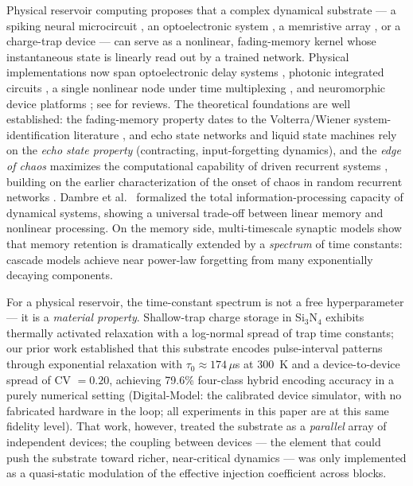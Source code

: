 \documentclass[11pt]{article}
\begin{document}
Physical reservoir computing proposes that a complex dynamical substrate --- a
spiking neural microcircuit \cite{maass2002}, an optoelectronic system
\cite{larger2012}, a memristive array \cite{du2017}, or a charge-trap device
\cite{prior} --- can serve as a nonlinear, fading-memory kernel whose
instantaneous state is linearly read out by a trained network. Physical
implementations now span optoelectronic delay systems
\cite{larger2012,paquot2012}, photonic integrated circuits \cite{brunner2013},
a single nonlinear node under time multiplexing \cite{appeltant2011}, and
neuromorphic device platforms \cite{grollier2020,markovic2020}; see
\cite{verstraeten2007,schrauwen2007,tanaka2019} for reviews. The theoretical
foundations are well established: the fading-memory property dates to the
Volterra/Wiener system-identification literature \cite{boyd1985}, and echo
state networks \cite{jaeger2001,lukosevicius2009} and
liquid state machines \cite{maass2002} rely on the \emph{echo state property}
(contracting, input-forgetting dynamics), and the \emph{edge of chaos}
maximizes the computational capability of driven recurrent systems
\cite{langton1990,bertschinger2004,legenstein2007}, building on the earlier
characterization of the onset of chaos in random recurrent networks
\cite{sompolinsky1988}. Dambre et al.\ \cite{dambre2012} formalized the total
information-processing capacity of dynamical systems, showing a universal
trade-off between linear memory and nonlinear processing. On the memory side,
multi-timescale synaptic models \cite{fusi2005,benna2016} show that memory
retention is dramatically extended by a \emph{spectrum} of time constants:
cascade models achieve near power-law forgetting from many exponentially
decaying components.

For a physical reservoir, the time-constant spectrum is not a free
hyperparameter --- it is a \emph{material property}. Shallow-trap charge storage
in Si$_3$N$_4$ exhibits thermally activated relaxation with a log-normal spread
of trap time constants; our prior work \cite{prior} established that this
substrate encodes pulse-interval patterns through exponential relaxation with
$\tau_0 \approx 174\,\mu$s at 300~K and a device-to-device spread of CV $=0.20$,
achieving 79.6\% four-class hybrid encoding accuracy in a purely numerical
setting (Digital-Model: the calibrated device simulator, with no fabricated
hardware in the loop; all experiments in this paper are at this same fidelity
level). That work, however, treated the substrate as a
\emph{parallel} array of independent devices; the coupling between devices ---
the element that could push the substrate toward richer, near-critical dynamics
--- was only implemented as a quasi-static modulation of the effective injection
coefficient across blocks.
\end{document}
